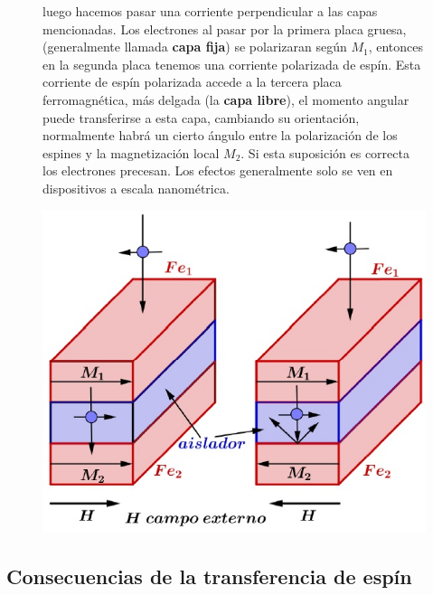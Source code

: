 \begin{figure}[H]
  \begin{minipage}[b]{0.47\textwidth}
luego hacemos pasar una corriente perpendicular a las capas mencionadas. Los electrones al pasar por la primera placa gruesa, (generalmente llamada \textbf{capa fija}) se polarizaran según $M_{1}$, entonces en la segunda placa tenemos una corriente polarizada de espín. Esta corriente de espín polarizada accede a la tercera placa ferromagnética, más delgada (la \textbf{capa libre}), el momento angular puede transferirse a esta capa, cambiando su orientación, normalmente habrá un cierto ángulo entre la polarización de los espines y la magnetización local $M_{2}$. Si esta suposición es correcta los electrones precesan. Los efectos generalmente solo se ven en dispositivos a escala nanométrica.
  \vspace{0cm}
  \end{minipage}
  \hfill
  \begin{minipage}[b]{0.47\textwidth}
     \includegraphics[width=1.0\textwidth]{./Figures/fig349}
	\label{fig:349}
	  \vspace{1.5cm}
  \end{minipage}
\end{figure}


\subsection{Consecuencias de la transferencia de espín}

